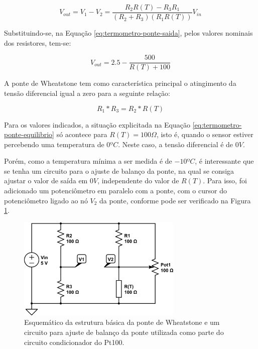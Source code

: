 \documentclass[a4paper]{instrumentacao}
\begin{document}
\begin{equation}
	V_{out}=V_1-V_2=\frac{R_2R(T)-R_3R_1}{(R_2+R_3)(R_1R(T))}V_{in}
	\label{eq:termometro-ponte-saida}
\end{equation}

Substituindo-se, na Equação \ref{eq:termometro-ponte-saida}, pelos valores nominais dos resistores, tem-se:

\begin{equation}
	V_{out}=2.5-\frac{500}{R(T)+100}
	\label{eq:termometro-ponte-saida-valores}
\end{equation}

A ponte de Wheatstone tem como característica principal o atingimento da tensão diferencial igual a zero para a seguinte relação:

 \begin{equation}
	R_1*R_3=R_2*R(T)
	\label{eq:termometro-ponte-equilibrio}
\end{equation}

Para os valores indicados, a situação explicitada na Equação \ref{eq:termometro-ponte-equilibrio} só acontece para $R(T)=100\Omega$, isto é, quando o sensor estiver percebendo uma temperatura de $0ºC$. Neste caso, a tensão diferencial é de $0V$.

Porém, como a temperatura mínima a ser medida é de $-10ºC$, é interessante que se tenha um circuito para o ajuste de balanço da ponte, na qual se consiga ajustar o valor de   saída em $0V$, independente do valor de $R(T)$. Para isso, foi adicionado um potenciômetro em paralelo com a ponte, com o cursor do potenciômetro ligado ao nó $V_2$ da ponte, conforme pode ser verificado na Figura \ref{fig:termometro-ponte-balanco}.

\begin{figure}[H]
	\centering \includegraphics[width=0.7\textwidth]{pt100-ponte-balanco.png}
	\caption{Esquemático da estrutura básica da ponte de Wheatstone e um circuito para ajuste de balanço da ponte utilizada como parte do circuito condicionador do Pt100.}
	\label{fig:termometro-ponte-balanco}
\end{figure}
\end{document}
